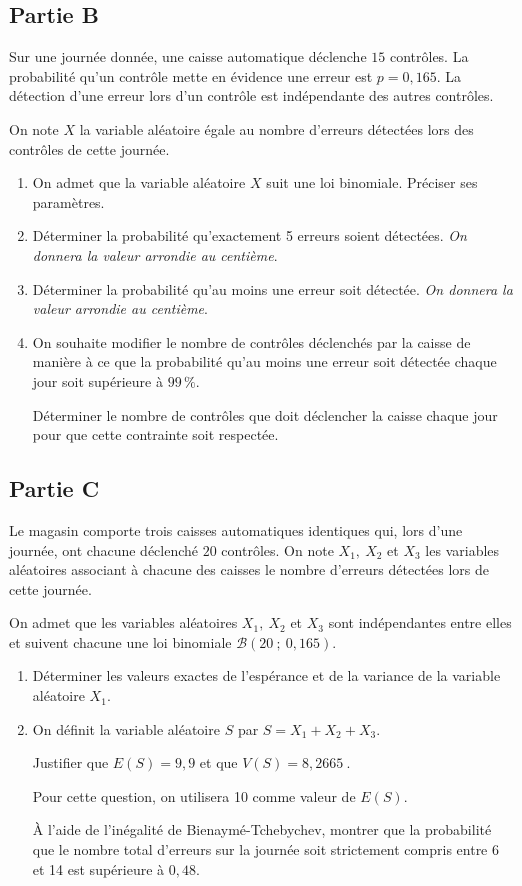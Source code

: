 \documentclass[10pt]{article}
\providecommand{\np}[2][]{{#2~#1}}
\begin{document}
\subsection*{Partie B}

Sur une journée donnée, une caisse automatique déclenche $15$ contrôles. La probabilité qu'un contrôle mette en évidence une erreur est $p = 0,165$. La détection d'une erreur lors d'un contrôle est indépendante des autres contrôles.

On note $X$ la variable aléatoire égale au nombre d'erreurs détectées lors des contrôles de cette journée.

\medskip

\begin{enumerate}
\item On admet que la variable aléatoire $X$ suit une loi binomiale. Préciser ses paramètres.
\item Déterminer la probabilité qu'exactement 5 erreurs soient détectées. \emph{On donnera la valeur arrondie au centième}.
\item Déterminer la probabilité qu'au moins une erreur soit détectée. \emph{On donnera la valeur arrondie au centième}.
\item On souhaite modifier le nombre de contrôles déclenchés par la caisse de manière à ce que la probabilité qu'au moins une erreur soit détectée chaque jour soit supérieure à $99\,\%$.

Déterminer le nombre de contrôles que doit déclencher la caisse chaque jour pour que cette contrainte soit respectée.
\end{enumerate}

\subsection*{Partie C}

Le magasin comporte trois caisses automatiques identiques qui, lors d'une journée, ont chacune déclenché $20$ contrôles. On note $X_1,\: X_2$ et $X_3$ les variables aléatoires associant à chacune des caisses le nombre d'erreurs détectées lors de cette journée.

On admet que les variables aléatoires $X_1,\: X_2$ et $X_3$ sont indépendantes entre elles et suivent chacune une loi binomiale $\mathcal{B}(20~;~0,165)$.

\medskip

\begin{enumerate}
\item Déterminer les valeurs exactes de l'espérance et de la variance de la variable aléatoire $X_1$.
\item On définit la variable aléatoire $S$ par $S = X_1 + X_2 + X_3$.

Justifier que $E(S) = 9,9$ et que $V(S) = \np{8,2665}$.

Pour cette question, on utilisera 10 comme valeur de $E(S)$.

À l'aide de l'inégalité de Bienaymé-Tchebychev, montrer que la probabilité que le nombre total d'erreurs sur la journée soit strictement compris entre 6 et 14 est supérieure à $0,48$.
\end{enumerate}

\bigskip
\end{document}
